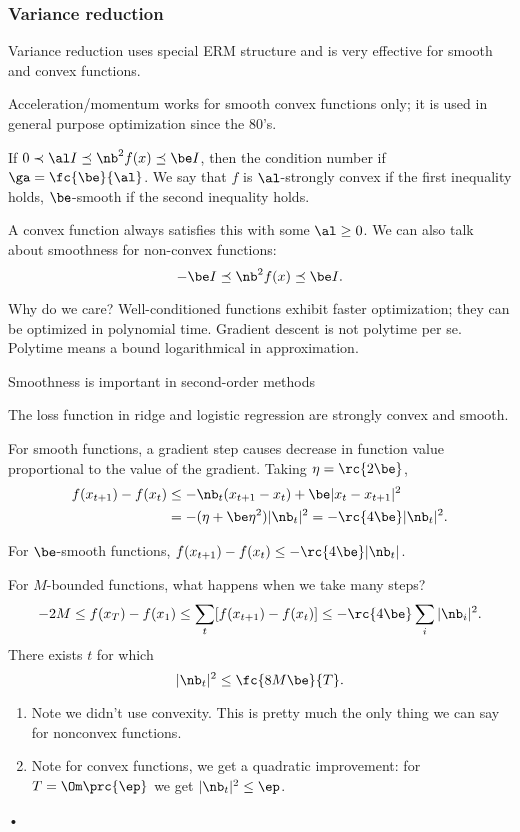 \subsubsection{Variance reduction}

Variance reduction uses special ERM structure and is very effective for smooth and convex functions.

Acceleration/momentum works for smooth convex functions only; it is used in general purpose optimization since the 80's.

\begin{df}
If $0\prec \al I \preceq \nb^2 f(x) \preceq \be I$, then
the condition number if $\ga = \fc{\be}{\al}$.
We say that $f$ is $\al$-strongly convex if the first inequality holds, $\be$-smooth if the second inequality holds.
\end{df}
A convex function always satisfies this with some $\al\ge 0$.
We can also talk about smoothness for non-convex functions:
$$
-\be I \preceq \nb^2 f(x) \preceq \be I.
$$

Why do we care?
Well-conditioned functions exhibit faster optimization; they can be optimized in polynomial time. Gradient descent is not polytime per se. Polytime means a bound logarithmical in approximation.

Smoothness is important in second-order methods

The loss function in ridge and logistic regression are strongly convex and smooth.

For smooth functions, a gradient step causes decrease in function value proportional to the value of the gradient. Taking $\eta=\rc{2\be}$,
\begin{align}
f(x_{t+1})-f(x_t)
&\le 
-\nb_t (x_{t+1}-x_t) + %
{\be }%
|x_t-x_{t+1}|^2\\
&=-(\eta +\be \eta^2) |\nb_t|^2 = -\rc{4\be} |\nb_t|^2.
\end{align}
\begin{lem}
For $\be$-smooth functions, $f(x_{t+1})-f(x_t)\le -\rc{4\be}|\nb_t|$.
\end{lem}
For $M$-bounded functions, what happens when we take many steps?
$$
-2M \le f(x_T)-f(x_1)\le \sum_t [f(x_{t+1})-f(x_t)]\le -\rc{4\be} \sum_i |\nb_i|^2.
$$
There exists $t$ for which 
$$
|\nb_t|^2 \le \fc{8M\be}{T}.
$$

\begin{enumerate}
\item
Note we didn't use convexity. This is pretty much the only thing we can say for nonconvex functions.
\item
Note for convex functions, we get a quadratic improvement: for $T=\Om\prc{\ep}$ we get $|\nb_t|^2\le \ep$. 
\end{enumerate}•


